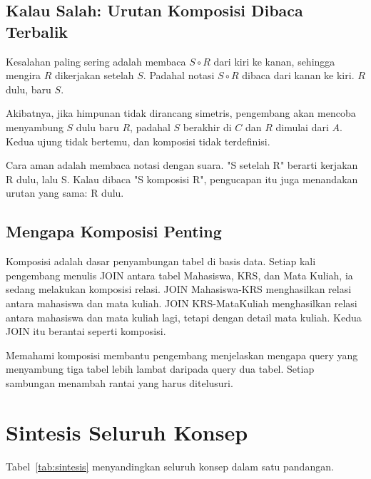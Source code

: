 \documentclass[11pt,a4paper]{article}
\begin{document}
\subsection{Kalau Salah: Urutan Komposisi Dibaca Terbalik}

Kesalahan paling sering adalah membaca $S \circ R$ dari kiri ke kanan, sehingga mengira $R$ dikerjakan setelah $S$. Padahal notasi $S \circ R$ dibaca dari kanan ke kiri. $R$ dulu, baru $S$.

Akibatnya, jika himpunan tidak dirancang simetris, pengembang akan mencoba menyambung $S$ dulu baru $R$, padahal $S$ berakhir di $C$ dan $R$ dimulai dari $A$. Kedua ujung tidak bertemu, dan komposisi tidak terdefinisi.

Cara aman adalah membaca notasi dengan suara. "S setelah R" berarti kerjakan R dulu, lalu S. Kalau dibaca "S komposisi R", pengucapan itu juga menandakan urutan yang sama: R dulu.

\subsection{Mengapa Komposisi Penting}

Komposisi adalah dasar penyambungan tabel di basis data. Setiap kali pengembang menulis JOIN antara tabel Mahasiswa, KRS, dan Mata Kuliah, ia sedang melakukan komposisi relasi. JOIN Mahasiswa-KRS menghasilkan relasi antara mahasiswa dan mata kuliah. JOIN KRS-MataKuliah menghasilkan relasi antara mahasiswa dan mata kuliah lagi, tetapi dengan detail mata kuliah. Kedua JOIN itu berantai seperti komposisi.

Memahami komposisi membantu pengembang menjelaskan mengapa query yang menyambung tiga tabel lebih lambat daripada query dua tabel. Setiap sambungan menambah rantai yang harus ditelusuri.

\section{Sintesis Seluruh Konsep}

Tabel~\ref{tab:sintesis} menyandingkan seluruh konsep dalam satu pandangan.
\end{document}
